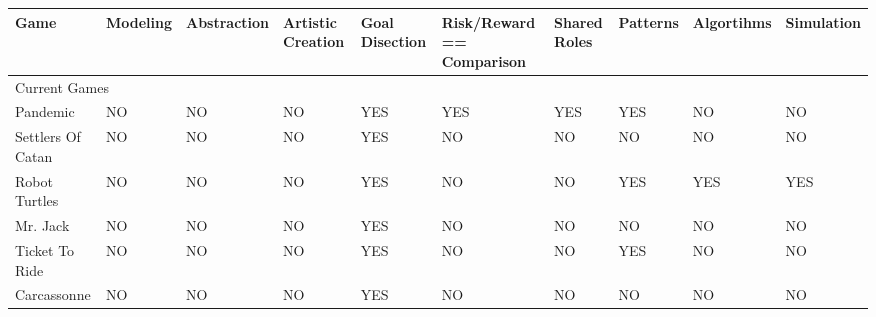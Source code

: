 \documentclass{acm_proc_article-sp}
\begin{document}
\clearpage
\begin{sidewaystable}[htbp]
\tiny
    \vspace*{-12cm}\hspace*{-1cm}\begin{tabular}{|p{1.5cm}||p{1.5cm}|p{2.5cm}|p{2.5cm}|p{2.7cm}|p{2cm}|p{1.5cm}|p{2cm}|p{3.5cm}|p{1.5cm}|}
    
    \hline

    Game
    & Modeling
    & Abstraction
    & Artistic Creation
    & Goal Disection
    & Risk/Reward == Comparison
    & Shared Roles
    & Patterns
    & Algortihms
    & Simulation \\ \hline \hline
    
    \multicolumn{10}{|l|}{Current Games}  \\ \hline \hline
    
    Pandemic
      & NO
      & NO
      & NO 
      & \cellcolor{blue!25}YES 
      & \cellcolor{blue!25}YES 
      & \cellcolor{blue!25}YES 
      & \cellcolor{blue!25}YES 
      & NO 
      & NO \\ \hline
    
    Settlers Of Catan 
      & NO 
      & NO 
      & NO 
      & \cellcolor{blue!25}YES 
      & NO 
      & NO 
      & NO 
      & NO 
      & NO \\ \hline

    Robot Turtles 
      & NO 
      & NO 
      & NO 
      & \cellcolor{blue!25}YES 
      & NO 
      & NO 
      & \cellcolor{blue!25}YES 
      & \cellcolor{blue!25}YES 
      & \cellcolor{blue!25}YES \\ \hline

    Mr. Jack 
      & NO 
      & NO 
      & NO 
      & \cellcolor{blue!25}YES 
      & NO 
      & NO 
      & NO 
      & NO 
      & NO \\ \hline

    Ticket To Ride 
      & NO 
      & NO 
      & NO 
      & \cellcolor{blue!25}YES 
      & NO 
      & NO 
      & \cellcolor{blue!25}YES 
      & NO 
      & NO \\ \hline

    Carcassonne 
      & NO 
      & NO 
      & NO 
      & \cellcolor{blue!25}YES 
      & NO 
      & NO 
      & NO 
      & NO 
      & NO \\ \hline


\end{tabular}
\end{sidewaystable}
\end{document}
